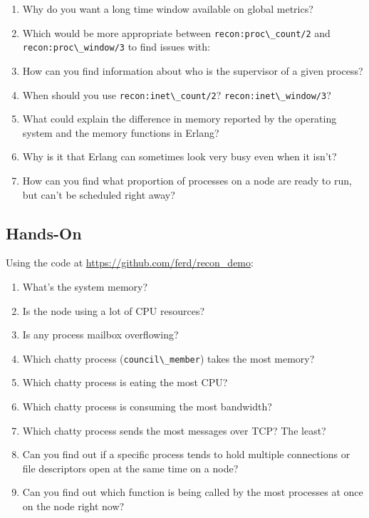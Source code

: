 \documentclass[11pt, oneside]{book}   	%
\newcommand{\module}[1]{\Verb`#1`}
\newcommand{\function}[1]{\Verb`#1`}
\begin{document}
\begin{enumerate}
	\item Why do you want a long time window available on global metrics?
	\item Which would be more appropriate between \function{recon:proc\_count/2} and \function{recon:proc\_window/3} to find issues with: 
	\item How can you find information about who is the supervisor of a given process?
	\item When should you use \function{recon:inet\_count/2}? \function{recon:inet\_window/3}?
	\item What could explain the difference in memory reported by the operating system and the memory functions in Erlang?
	\item Why is it that Erlang can sometimes look very busy even when it isn't?
	\item How can you find what proportion of processes on a node are ready to run, but can't be scheduled right away?
\end{enumerate}

\subsection{Hands-On}

Using the code at \href{https://github.com/ferd/recon\_demo}{https://github.com/ferd/recon\_demo}:

\begin{enumerate}
	\item What's the system memory?
	\item Is the node using a lot of CPU resources?
	\item Is any process mailbox overflowing?
	\item Which chatty process (\module{council\_member}) takes the most memory?
	\item Which chatty process is eating the most CPU?
	\item Which chatty process is consuming the most bandwidth?
	\item Which chatty process sends the most messages over TCP? The least?
	\item Can you find out if a specific process tends to hold multiple connections or file descriptors open at the same time on a node?
	\item Can you find out which function is being called by the most processes at once on the node right now?
\end{enumerate}
\end{document}
